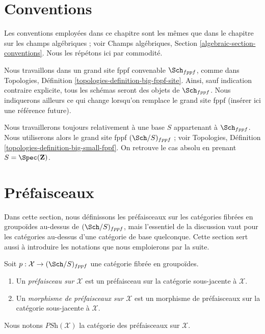 \section{Conventions}
\label{section-conventions}

\noindent
Les conventions employées dans ce chapitre sont les mêmes que dans le
chapitre sur les champs algébriques ; voir
Champs algébriques, Section \ref{algebraic-section-conventions}.
Nous les répétons ici par commodité.

\medskip\noindent
Nous travaillons dans un grand site fppf convenable $\Sch_{fppf}$, comme dans
Topologies, Définition \ref{topologies-definition-big-fppf-site}.
Ainsi, sauf indication contraire explicite, tous les schémas seront des objets
de $\Sch_{fppf}$. Nous indiquerons ailleurs ce qui change lorsqu'on remplace le
grand site fppf (insérer ici une référence future).

\medskip\noindent
Nous travaillerons toujours relativement à une base $S$ appartenant à $\Sch_{fppf}$.
Nous utiliserons alors le grand site fppf $(\Sch/S)_{fppf}$ ; voir
Topologies, Définition \ref{topologies-definition-big-small-fppf}.
On retrouve le cas absolu en prenant
$S = \Spec(\mathbf{Z})$.





\section{Préfaisceaux}
\label{section-presheaves}

\noindent
Dans cette section, nous définissons les préfaisceaux sur les catégories fibrées en
groupoïdes au-dessus de $(\Sch/S)_{fppf}$, mais l'essentiel de la discussion vaut
pour les catégories au-dessus d'une catégorie de base quelconque. Cette section sert aussi à
introduire les notations que nous emploierons par la suite.

\begin{definition}
\label{definition-presheaves}
Soit $p : \mathcal{X} \to (\Sch/S)_{fppf}$ une catégorie fibrée en
groupoïdes.
\begin{enumerate}
\item Un {\it préfaisceau sur $\mathcal{X}$} est un préfaisceau sur la
catégorie sous-jacente à $\mathcal{X}$.
\item Un {\it morphisme de préfaisceaux sur $\mathcal{X}$} est un morphisme de
préfaisceaux sur la catégorie sous-jacente à $\mathcal{X}$.
\end{enumerate}
Nous notons $\textit{PSh}(\mathcal{X})$ la catégorie des préfaisceaux sur
$\mathcal{X}$.
\end{definition}

